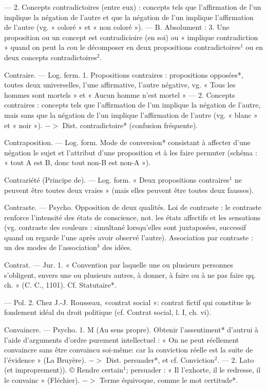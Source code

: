 — 2. Concepts contradictoires (entre
eux) : concepts tels que l'affirmation
de l’un implique la négation de
l’autre et que la négation de l’un
implique l'affirmation de l’autre
(vg. « coloré » et « non coloré »). —
B. Absolument : 3. Une proposition
ou un concept est contradicioire (en
soi) ou « implique contradiction »
quand on peut la cou le décomposer
en deux propositions contradictoires$^1$ ou en deux concepts contradictoires$^2$.

Contraire. — Log. ferm. 1. Propositions contraires : propositions opposées*, toutes deux universelles, l’une
affirmative, l’autre négative, vg.
« Tous les hommes sont mortels » et
« Aucun homme n’est mortel » —
2. Concepts contraires : concepts tels
que l'affirmation de l’un implique
la négation de l’autre, mais sans que
la négation de l'un implique l’affirmation de l’autre (vg. « blanc » et
« noir »). $->$ Dist. contradictoire*
(confusion fréquente).

Contraposition. — Log. form. Mode
de conversion* consistant à affecter
d’une négation le sujet et l’attribut
d'une proposition et à les faire permuter (schéma : « tout A est B,
donc tout non-B est non-A »).

Contrariété (Principe de). — Log.
form. « Deux propositions contraires$^1$
ne peuvent être toutes deux vraies »
(mais elles peuvent être toutes deux
fausses).

Contraste. — Psycho. Opposition de
deux qualités. Loi de contraste : le
contraste renforce l'intensité des
états de conscience, not. les états
affectifs et les sensations (vg. contraste des couleurs : simultané lorsqu’elles sont juxtaposées, successif
quand on regarde l’une après avoir
observé l’autre). Association par contraste :
un des modes de l’association$^3$ des idées.

Contrat. — Jur. 1. « Convention par
laquelle une ou plusieurs personnes
s’obligent, envers une ou plusieurs
autres, à donner, à faire ou à ne
pas faire qq. ch. » (C. C., 1101). Cf.
Statutaire*.

— Pol. 2. Chez J.-J. Rousseau,
«contrat social »: contrat fictif qui
constitue le fondement idéal du
droit politique (cf. Contrat social,
l. I, ch. vi).

Convaincre. — Psycho. 1. M (Au sens
propre). Obtenir  l’assentiment*
d'autrui à l’aide d'arguments d'ordre
purement intellectuel : « On ne peut
réellement convaincre sans être
convaincu soi-même: car la conviction réelle est la suite de l'évidence »
(La Bruyère). $->$ Dist. persuader*,
et cf. Conviction$^2$. — 2. Lato (et
improprement)). © Rendre certain$^1$;
persuader : « Il l’exhorte, il le redresse, il le convainc » (Fléchier).
$->$ Terme équivoque, comme le
mot certitude*.

